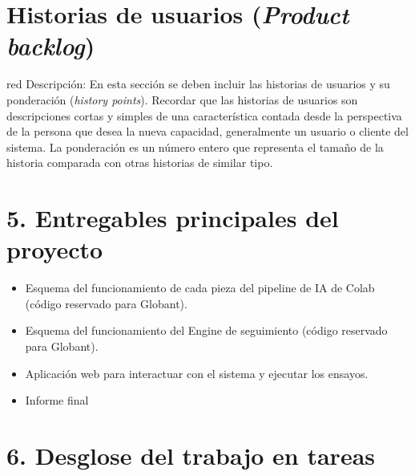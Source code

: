 \documentclass[11pt]{charter}
\begin{document}
\section{Historias de usuarios (\textit{Product backlog})}
\label{sec:backlog}

\begin{consigna}{red}
Descripción: En esta sección se deben incluir las historias de usuarios y su ponderación (\textit{history points}). Recordar que las historias de usuarios son descripciones cortas y simples de una característica contada desde la perspectiva de la persona que desea la nueva capacidad, generalmente un usuario o cliente del sistema. La ponderación es un número entero que representa el tamaño de la historia comparada con otras historias de similar tipo.
\end{consigna}

\section{5. Entregables principales del proyecto}
\label{sec:entregables}

\begin{itemize}
\item Esquema del funcionamiento de cada pieza del pipeline de IA de Colab (código reservado para Globant).
\item Esquema del funcionamiento del Engine de seguimiento (código reservado para Globant).
\item Aplicación web para interactuar con el sistema y ejecutar los ensayos.
\item Informe final
\end{itemize}

\section{6. Desglose del trabajo en tareas}
\label{sec:wbs}
\end{document}
